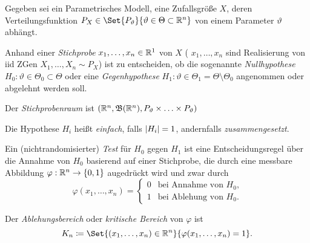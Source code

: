 \documentclass{cheat-sheet}
\newcommand{\Bor}{\mathfrak{B}} %
\begin{document}




\begin{modell}
  Gegeben sei ein Parametrisches Modell, \dh eine Zufallsgröße $X$, deren Verteilungsfunktion $P_X \in \Set{P_\vartheta}{\vartheta \in \Theta \subset \R^n}$ von einem Parameter $\vartheta$ abhängt.
\end{modell}

\begin{prob}
  Anhand einer \emph{Stichprobe} $x_1, \ldots, x_n \in \mathbb{R}^1$ von $X$ (\dh{} $x_1, \ldots, x_n$ sind Realisierung von iid ZGen $X_1, \ldots, X_n \sim P_X$) ist zu entscheiden, ob die sogenannte \emph{Nullhypothese} $H_0 : \vartheta \in \Theta_0 \subset \Theta$ oder eine \emph{Gegenhypothese} $H_1 : \vartheta \in \Theta_1 = \Theta \setminus \Theta_0$ angenommen oder abgelehnt werden soll.
\end{prob}

\begin{defn}
  Der \emph{Stichprobenraum} ist $(\R^n, \Bor(\R^n), P_\vartheta \times \ldots \times P_\vartheta)$
\end{defn}

\begin{terminologie}
  Die Hypothese $H_i$ heißt \emph{einfach}, falls $\lvert H_i\rvert = 1$, andernfalls \emph{zusammengesetzt}.
\end{terminologie}

\begin{defn}
  Ein (nichtrandomisierter) \emph{Test} für $H_0$ gegen $H_1$ ist eine Entscheidungsregel über die Annahme von $H_0$ basierend auf einer Stichprobe, die durch eine messbare Abbildung $\varphi : \mathbb{R}^n \to \{ 0, 1 \}$ augedrückt wird und zwar durch
  \[ \varphi(x_1, \ldots, x_n) = \begin{cases}
    0 & \text{bei Annahme von $H_0$,} \\
    1 & \text{bei Ablehung von $H_0$.}
  \end{cases} \]
\end{defn}

\begin{defn}
  Der \emph{Ablehungsbereich} oder \emph{kritische Bereich} von $\varphi$ ist
  \[ K_n \coloneqq \Set{(x_1, \ldots, x_n) \in \R^n}{\varphi(x_1, \ldots, x_n) = 1}. \]
\end{defn}
\end{document}

